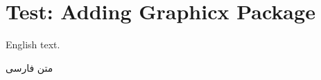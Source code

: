 \documentclass[12pt,a4paper]{article}
\newcommand{\fa}[1]{\textfarsi{#1}}
\begin{document}
\section*{Test: Adding Graphicx Package}

English text.

\fa{متن فارسی}

\end{document}
